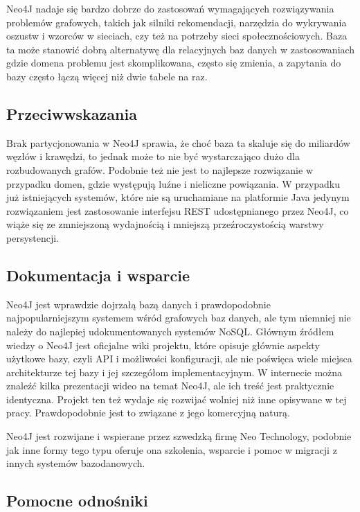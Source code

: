 Neo4J nadaje się bardzo dobrze do zastosowań wymagających rozwiązywania problemów grafowych, takich jak silniki rekomendacji, narzędzia do wykrywania oszustw i wzorców w sieciach, czy też na potrzeby sieci społecznościowych.
Baza ta może stanowić dobrą alternatywę dla relacyjnych baz danych w zastosowaniach gdzie domena problemu jest skomplikowana, często się zmienia, a zapytania do bazy często łączą więcej niż dwie tabele na raz.

\subsection*{Przeciwwskazania}

Brak partycjonowania w Neo4J sprawia, że choć baza ta skaluje się do miliardów węzłów i krawędzi, to jednak może to nie być wystarczająco dużo dla rozbudowanych grafów.
Podobnie też nie jest to najlepsze rozwiązanie w przypadku domen, gdzie występują luźne i nieliczne powiązania.
W przypadku już istniejących systemów, które nie są uruchamiane na platformie Java jedynym rozwiązaniem jest zastosowanie interfejsu REST udostępnianego przez Neo4J, co wiąże się ze zmniejszoną wydajnością i mniejszą przeźroczystością warstwy persystencji.

\subsection*{Dokumentacja i wsparcie}

Neo4J jest wprawdzie dojrzałą bazą danych i prawdopodobnie najpopularniejszym systemem wśród grafowych baz danych, ale tym niemniej nie należy do najlepiej udokumentowanych systemów NoSQL.
Głównym źródłem wiedzy o Neo4J jest oficjalne wiki projektu, które opisuje głównie aspekty użytkowe bazy, czyli API i możliwości konfiguracji, ale nie poświęca wiele miejsca architekturze tej bazy i jej szczegółom implementacyjnym.
W internecie można znaleźć kilka prezentacji wideo na temat Neo4J, ale ich treść jest praktycznie identyczna.
Projekt ten też wydaje się rozwijać wolniej niż inne opisywane w tej pracy.
Prawdopodobnie jest to związane z jego komercyjną naturą.

Neo4J jest rozwijane i wspierane przez szwedzką firmę Neo Technology, podobnie jak inne formy tego typu oferuje ona szkolenia, wsparcie i pomoc w migracji z innych systemów bazodanowych.

\subsection*{Pomocne odnośniki}

